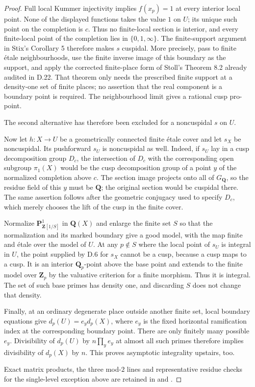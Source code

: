 \begin{proof}
Full local Kummer injectivity implies $f(x_p)=1$ at every
interior local point.  None of the displayed functions takes
the value $1$ on $U$; its unique such point on the completion
is $c$.  Thus no finite-local section is interior, and every
finite-local point of the completion lies in
$\{0,1,\infty\}$.  The finite-support argument in Stix's
Corollary 5 therefore makes $s$ cuspidal.  More precisely,
pass to finite étale neighbourhoods, use the finite inverse
image of this boundary as the support, and apply the corrected
finite-place form of Stoll's Theorem 8.2 already audited in
D.22.  That theorem only needs the prescribed finite support
at a density-one set of finite places; no assertion that the
real component is a boundary point is required.  The
neighbourhood limit gives a rational cusp pro-point.

The second alternative has therefore been excluded for a
noncuspidal $s$ on $U$.

Now let $h:X\to U$ be a geometrically connected finite étale
cover and let $s_X$ be noncuspidal.  Its pushforward $s_U$ is
noncuspidal as well.  Indeed, if $s_U$ lay in a cusp decomposition
group $D_c$, the intersection of $D_c$ with the corresponding
open subgroup $\pi_1(X)$ would be the cusp decomposition group
of a point $y$ of the normalized completion above $c$.
The section image projects onto all of $G_{\mathbf Q}$, so
the residue field of this $y$ must be $\mathbf Q$; the original
section would be cuspidal there.  The same assertion follows
after the geometric conjugacy used to specify $D_c$, which
merely chooses the lift of the cusp in the finite cover.

Normalize $\mathbf P^1_{\mathbf Z[1/S]}$ in $\mathbf Q(X)$
and enlarge the finite set $S$ so that the normalization and
its marked boundary give a good model, with the map finite
and étale over the model of $U$.  At any $p\notin S$ where
the local point of $s_U$ is integral in $U$, the point supplied
by D.6 for $s_X$ cannot be a cusp, because a cusp maps to a
cusp.  It is an interior $\mathbf Q_p$-point above the base
point and extends to the finite model over $\mathbf Z_p$ by
the valuative criterion for a finite morphism.  Thus it is
integral.  The set of such base primes has density one, and
discarding $S$ does not change that density.

Finally, at an ordinary degenerate place outside another
finite set, local boundary equations give
$d_p(U)=e_y d_p(X)$, where $e_y$ is the fixed horizontal
ramification index at the corresponding boundary point.
There are only finitely many possible $e_y$.  Divisibility
of $d_p(U)$ by $n\prod_y e_y$ at almost all such primes
therefore implies divisibility of $d_p(X)$ by $n$.
This proves asymptotic integrality upstairs, too.

Exact matrix products,
the three mod-$2$ lines and representative residue checks for
the single-level exception above are retained in
 and
.
\end{proof}

